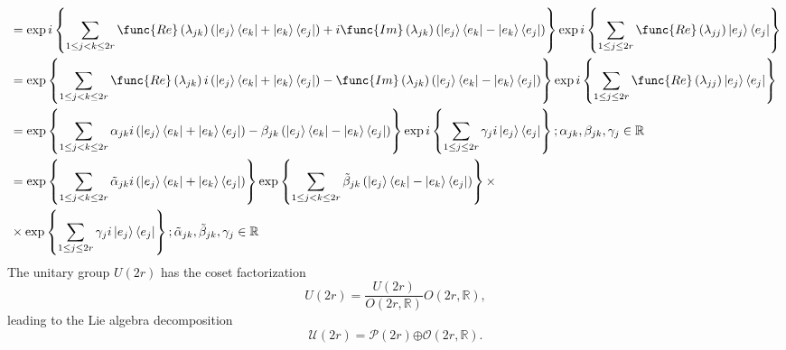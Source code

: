 \documentclass[aps,preprint]{revtex4}
\begin{document}
\begin{align}
& =\exp i\left\{ \sum_{1\leq j<k\leq2r}\func{Re}\left( \lambda _{jk}\right)
\left( \left\vert e_{j}\right\rangle \left\langle e_{k}\right\vert
+\left\vert e_{k}\right\rangle \left\langle e_{j}\right\vert \right) +i\func{%
Im}\left( \lambda_{jk}\right) \left( \left\vert e_{j}\right\rangle
\left\langle e_{k}\right\vert -\left\vert e_{k}\right\rangle \left\langle
e_{j}\right\vert \right) \right\} \exp i\left\{ \sum_{1\leq j\leq2r}\func{Re}%
\left( \lambda_{jj}\right) \left\vert e_{j}\right\rangle \left\langle
e_{j}\right\vert \right\} \\
& =\exp\left\{ \sum_{1\leq j<k\leq2r}\func{Re}\left( \lambda _{jk}\right)
i\left( \left\vert e_{j}\right\rangle \left\langle e_{k}\right\vert
+\left\vert e_{k}\right\rangle \left\langle e_{j}\right\vert \right) -\func{%
Im}\left( \lambda_{jk}\right) \left( \left\vert e_{j}\right\rangle
\left\langle e_{k}\right\vert -\left\vert e_{k}\right\rangle \left\langle
e_{j}\right\vert \right) \right\} \exp i\left\{ \sum_{1\leq j\leq2r}\func{Re}%
\left( \lambda_{jj}\right) \left\vert e_{j}\right\rangle \left\langle
e_{j}\right\vert \right\} \\
& =\exp\left\{ \sum_{1\leq j<k\leq2r}\alpha_{jk}i\left( \left\vert
e_{j}\right\rangle \left\langle e_{k}\right\vert +\left\vert
e_{k}\right\rangle \left\langle e_{j}\right\vert \right) -\beta_{jk}\left(
\left\vert e_{j}\right\rangle \left\langle e_{k}\right\vert -\left\vert
e_{k}\right\rangle \left\langle e_{j}\right\vert \right) \right\} \exp
i\left\{ \sum_{1\leq j\leq2r}\gamma_{j}i\left\vert e_{j}\right\rangle
\left\langle e_{j}\right\vert \right\} ;\alpha_{jk},\beta_{jk},\gamma_{j}\in%
\mathbb{R} \\
& =\exp\left\{ \sum_{1\leq j<k\leq2r}\tilde{\alpha}_{jk}i\left( \left\vert
e_{j}\right\rangle \left\langle e_{k}\right\vert +\left\vert
e_{k}\right\rangle \left\langle e_{j}\right\vert \right) \right\}
\exp\left\{ \sum_{1\leq j<k\leq2r}\tilde{\beta}_{jk}\left( \left\vert
e_{j}\right\rangle \left\langle e_{k}\right\vert -\left\vert
e_{k}\right\rangle \left\langle e_{j}\right\vert \right) \right\} \times \\
& \times\exp\left\{ \sum_{1\leq j\leq2r}\gamma_{j}i\left\vert
e_{j}\right\rangle \left\langle e_{j}\right\vert \right\} ;\tilde{\alpha}%
_{jk},\tilde{\beta}_{jk},\gamma_{j}\in\mathbb{R}
\end{align}
The unitary group $U\left( 2r\right) $ has the coset factorization 
\begin{equation}
U\left( 2r\right) =\frac{U\left( 2r\right) }{O\left( 2r,\mathbb{R}\right) }%
O\left( 2r,\mathbb{R}\right) ,
\end{equation}
leading to the Lie algebra decomposition%
\begin{equation}
\mathcal{U}\left( 2r\right) =\mathcal{P}\left( 2r\right) \mathcal{\oplus O}%
\left( 2r,\mathbb{R}\right) .
\end{equation}
\end{document}
